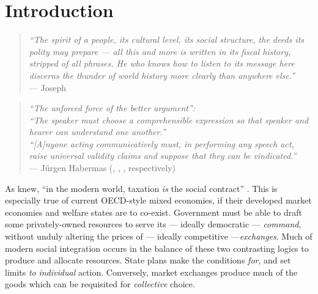 \section{Introduction}

\begin{quote}
    \emph{``The spirit of a people, its cultural level, its social structure, the deeds its polity may prepare --- all this and more is written in its fiscal history, stripped of all phrases.
    He who knows how to listen to its message here discerns the thunder of world history more clearly than anywhere else.''}\\
    --- Joseph \cite[6]{Schumpeter}
\end{quote}

\begin{quote}
    \emph{``The unforced force of the better argument'':}\\
    \emph{``The speaker must choose a comprehensible expression so that speaker and hearer can understand one another.''}\\
    \emph{``[A]nyone acting communicatively must, in performing any speech act, raise universal validity claims and suppose that they can be vindicated.''}\\
    --- Jürgen Habermas (\citeyear[305]{Habermas1996}, \citeyear[2f]{Habermas1976}, \citeyear[2]{Habermas1979}, respectively)
\end{quote}


As \citeauthor{Schumpeter} knew, ``in the modern world, taxation \emph{is} the social contract'' \citep[1, emphasis in original]{Martin2009a}.
This is especially true of current \gls{OECD}-style mixed economies, if their developed market economies and welfare states are to co-exist. 
Government must be able to draft some privately-owned resources to serve its --- ideally democratic --- \emph{command}, without unduly altering the prices of --- ideally competitive ---\emph{exchanges}.
Much of modern social integration occurs in the balance of these two contrasting logics to produce and allocate resources. 
State plans make the conditions \emph{for}, and set limits \emph{to} \emph{individual} action.
Conversely, market exchanges produce much of the goods which can be requisited for \emph{collective} choice.


